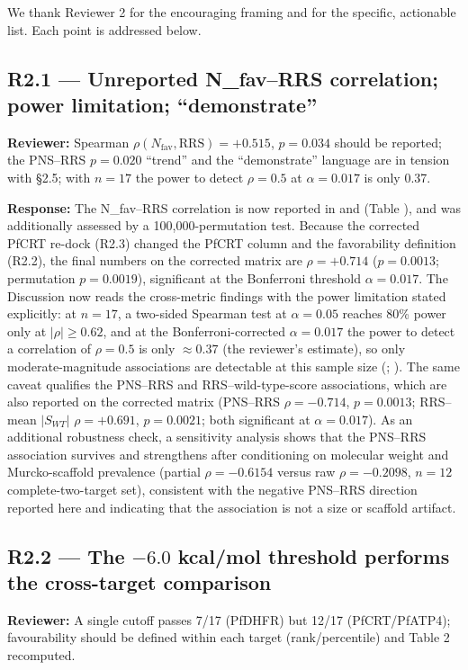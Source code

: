 \documentclass[11pt]{article}
\begin{document}
We thank Reviewer 2 for the encouraging framing and for the specific, actionable list. Each
point is addressed below.

\subsection*{R2.1 --- Unreported N\_fav--RRS correlation; power limitation; ``demonstrate''}
\textbf{Reviewer:} Spearman $\rho(N_{\mathrm{fav}},\mathrm{RRS})=+0.515$, $p=0.034$ should be
reported; the PNS--RRS $p=0.020$ ``trend'' and the ``demonstrate'' language are in tension
with \S2.5; with $n=17$ the power to detect $\rho=0.5$ at $\alpha=0.017$ is only 0.37.

\textbf{Response:} The N\_fav--RRS correlation is now reported in  and  (Table ), and was additionally assessed by a 100{,}000-permutation test.
Because the corrected PfCRT re-dock (R2.3) changed the PfCRT column and the
favorability definition (R2.2), the final numbers on the corrected matrix are
$\rho=+0.714$ ($p=0.0013$; permutation $p=0.0019$), significant at the
Bonferroni threshold $\alpha=0.017$. The Discussion now reads the cross-metric
findings with the power limitation stated explicitly: at $n=17$, a two-sided
Spearman test at $\alpha=0.05$ reaches 80\% power only at $|\rho|\ge0.62$, and
at the Bonferroni-corrected $\alpha=0.017$ the power to detect a correlation of
$\rho=0.5$ is only $\approx0.37$ (the reviewer's estimate), so only
moderate-magnitude associations are detectable at this sample size
(; ). The same caveat qualifies the PNS--RRS and
RRS--wild-type-score associations, which are also reported on the corrected
matrix (PNS--RRS $\rho=-0.714$, $p=0.0013$; RRS--mean $|S_{WT}|$ $\rho=+0.691$,
$p=0.0021$; both significant at $\alpha=0.017$). As an additional robustness
check, a sensitivity analysis shows that the PNS--RRS association survives and
strengthens after conditioning on molecular weight and Murcko-scaffold prevalence
(partial $\rho=-0.6154$ versus raw $\rho=-0.2098$, $n=12$ complete-two-target
set), consistent with the negative PNS--RRS direction reported here and
indicating that the association is not a size or scaffold artifact.

\subsection*{R2.2 --- The $-6.0$ kcal/mol threshold performs the cross-target comparison}
\textbf{Reviewer:} A single cutoff passes 7/17 (PfDHFR) but 12/17 (PfCRT/PfATP4); favourability
should be defined within each target (rank/percentile) and Table 2 recomputed.
\end{document}
